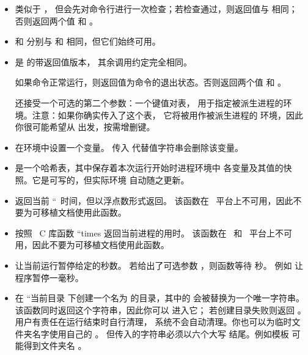 \begin{itemize}
    在 \MSWINDOWS\ 上，当前进程实际上会一直保留在内存中，直到命令执行完毕。
    这避免了在集成 \TEX\ 环境中运行 \TEXLUA\ 脚本时发生崩溃。

    引入这条命令的初衷，是让当前进程在启动新进程之前先清理干净，
    因此它特别适合在 \TEXLUA\ 中使用。

\item {} 类似于 ，
    但会先对命令行进行一次检查；若检查通过，则返回值与  相同；
    否则返回两个值  和 。

\item {} 和  分别与
     和  相同，但它们始终可用。

\item {} 是  的带返回值版本，
    其余调用约定完全相同。

    如果命令正常运行，则返回值为命令的退出状态。否则返回两个值
     和 。

     还接受一个可选的第二个参数：一个键值对表，
    用于指定被派生进程的环境。注意：如果你确实传入了这个表，
    它将被用作被派生进程的  环境，因此你很可能希望从
     出发，按需增删键。

\item {} 在环境中设置一个变量。
    传入  代替值字符串会删除该变量。

\item {} 是一个哈希表，其中保存着本次运行开始时进程环境中
    各变量及其值的快照。它是可写的，但实际环境  自动随之更新。

\item {} 返回当前 ``\UNIX\ 时间，但以浮点数形式返回。
    该函数在 \SUNOS\ 平台上不可用，因此不要为可移植文档使用此函数。

\item {} 按照 \UNIX\ C 库函数 ``times 返回当前进程的用时。
    该函数在 \MSWINDOWS\ 和 \SUNOS\ 平台上不可用，因此不要为可移植文档使用此函数。

\item {} 让当前运行暂停给定的秒数。
    若给出了可选参数 ，则函数等待  秒。
    例如  让程序暂停一毫秒。

\item {} 在 ``当前目录 下创建一个名为
     的目录，其中的  会被替换为一个唯一字符串。
    该函数同时返回这个字符串，因此你可以  进入它；
    若创建目录失败则返回 。用户有责任在运行结束时自行清理，
    系统不会自动清理。你也可以为临时文件夹名字使用自己的 。
    但传入的字符串必须以六个大写  结尾。例如模板 
    可能得到文件夹名 。


\end{itemize}
